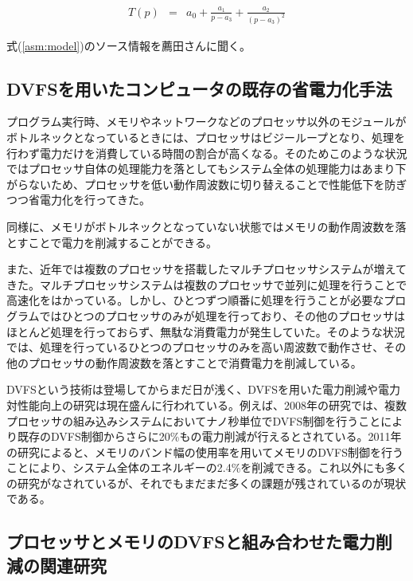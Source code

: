 \begin{eqnarray}
T(p) &=& a_0 + \frac{a_1}{p-a_3} + \frac{a_2}{(p-a_3)^2} \label{asm:model}
\end{eqnarray}

式(\ref{asm:model})のソース情報を薦田さんに聞く。


\subsection{DVFSを用いたコンピュータの既存の省電力化手法}

プログラム実行時、メモリやネットワークなどのプロセッサ以外のモジュールがボトルネックとなっているときには、プロセッサはビジーループとなり、処理を行わず電力だけを消費している時間の割合が高くなる。そのためこのような状況ではプロセッサ自体の処理能力を落としてもシステム全体の処理能力はあまり下がらないため、プロセッサを低い動作周波数に切り替えることで性能低下を防ぎつつ省電力化を行ってきた。

同様に、メモリがボトルネックとなっていない状態ではメモリの動作周波数を落とすことで電力を削減することができる\cite{David:2011:MPM:1998582.1998590}。

また、近年では複数のプロセッサを搭載したマルチプロセッサシステムが増えてきた。マルチプロセッサシステムは複数のプロセッサで並列に処理を行うことで高速化をはかっている。しかし、ひとつずつ順番に処理を行うことが必要なプログラムではひとつのプロセッサのみが処理を行っており、その他のプロセッサはほとんど処理を行っておらず、無駄な消費電力が発生していた。そのような状況では、処理を行っているひとつのプロセッサのみを高い周波数で動作させ、その他のプロセッサの動作周波数を落とすことで消費電力を削減している。

DVFSという技術は登場してからまだ日が浅く、DVFSを用いた電力削減や電力対性能向上の研究は現在盛んに行われている。例えば、2008年の研究では、複数プロセッサの組み込みシステムにおいてナノ秒単位でDVFS制御を行うことにより既存のDVFS制御からさらに20\%もの電力削減が行えるとされている\cite{4658633}。2011年の研究によると、メモリのバンド幅の使用率を用いてメモリのDVFS制御を行うことにより、システム全体のエネルギーの2.4\%を削減できる\cite{David:2011:MPM:1998582.1998590}。これ以外にも多くの研究がなされているが、それでもまだまだ多くの課題が残されているのが現状である。

\subsection{プロセッサとメモリのDVFSと組み合わせた電力削減の関連研究}

